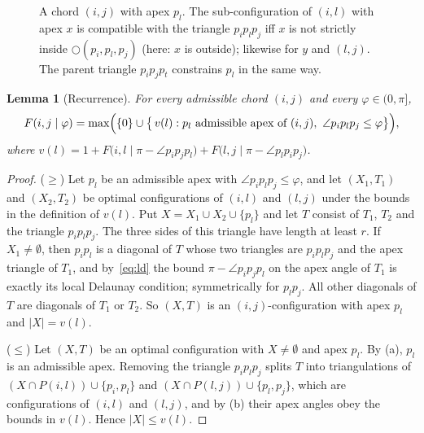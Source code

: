 \documentclass[11pt,a4paper]{article}
\newtheorem{lemma}[theorem]{Lemma}
\theoremstyle{definition}
\theoremstyle{remark}
\newcommand{\ang}{\angle}
\newcommand{\circlethree}[3]{\bigcirc(#1,#2,#3)}
\begin{document}
\begin{figure}[tb]
\centering
{}
\caption{A chord $(i,j)$ with apex $p_l$. The sub-configuration of $(i,l)$
with apex $x$ is compatible with the triangle $p_ip_lp_j$ iff $x$ is not
strictly inside $\circlethree{p_i}{p_l}{p_j}$ (here: $x$ is outside); likewise
for $y$ and $(l,j)$. The parent triangle $p_ip_jp_t$ constrains $p_l$ in the
same way.}
\label{fig:dp}
\end{figure}

\begin{lemma}[Recurrence]\label{lem:rec}
For every admissible chord $(i,j)$ and every $\varphi\in(0,\pi]$,
\[
F(i,j\mid\varphi)=\max\Bigl(\{0\}\cup\bigl\{\,v(l) : p_l\text{ admissible apex of }(i,j),\ \ang p_ip_lp_j\le\varphi\bigr\}\Bigr),
\]
where
$v(l)=1+F\bigl(i,l\mid\pi-\ang p_ip_jp_l\bigr)+F\bigl(l,j\mid\pi-\ang p_lp_ip_j\bigr)$.
\end{lemma}
\begin{proof}
($\ge$) Let $p_l$ be an admissible apex with $\ang p_ip_lp_j\le\varphi$, and
let $(X_1,T_1)$ and $(X_2,T_2)$ be optimal configurations of $(i,l)$ and
$(l,j)$ under the bounds in the definition of $v(l)$. Put
$X=X_1\cup X_2\cup\{p_l\}$ and let $T$ consist of $T_1$, $T_2$ and the
triangle $p_ip_lp_j$. The three sides of this triangle have length at least
$r$. If $X_1\ne\emptyset$, then $p_ip_l$ is a diagonal of $T$ whose two
triangles are $p_ip_lp_j$ and the apex triangle of $T_1$, and
by~\eqref{eq:ld} the bound $\pi-\ang p_ip_jp_l$ on the apex angle of $T_1$ is
exactly its local Delaunay condition; symmetrically for $p_lp_j$. All other
diagonals of $T$ are diagonals of $T_1$ or $T_2$. So $(X,T)$ is an
$(i,j)$-configuration with apex $p_l$ and $|X|=v(l)$.

($\le$) Let $(X,T)$ be an optimal configuration with $X\ne\emptyset$ and apex
$p_l$. By (a), $p_l$ is an admissible apex. Removing the triangle $p_ip_lp_j$
splits $T$ into triangulations of $(X\cap P(i,l))\cup\{p_i,p_l\}$ and
$(X\cap P(l,j))\cup\{p_l,p_j\}$, which are configurations of $(i,l)$ and
$(l,j)$, and by (b) their apex angles obey the bounds in $v(l)$. Hence
$|X|\le v(l)$.
\end{proof}
\end{document}
